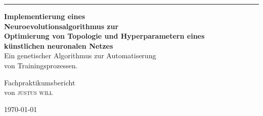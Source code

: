 \begin{titlepage} %
	
	\raggedleft %
	
	\rule{1pt}{0.98\textheight} %
	\hspace{0.05\textwidth} %
	\parbox[b]{0.9\textwidth}{ %
		
		{\Huge\bfseries Implementierung eines\\[0.1\baselineskip]
		Neuroevolutionsalgorithmus zur\\[0.1\baselineskip]
		Optimierung von Topologie und Hyperparametern eines \\[0.1\baselineskip]
		künstlichen neuronalen Netzes} \\[0\baselineskip] %
		
		{\Large Ein genetischer Algorithmus zur Automatiserung\\[0.2\baselineskip] von Trainingsprozessen. }\\[2.2\baselineskip] %
		
		\vspace{0.1\textheight}

		{\huge Fachpraktikumsbericht}\\[2.4\baselineskip] %

		{von \Large\textsc{justus will}}\\[2.4\baselineskip]
		
		\vspace{0.3\textheight}
		
		{\Large \today}
	}
	
\end{titlepage}

